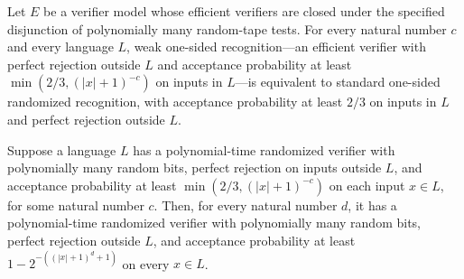 \begin{theorem}
\label{Randomized.inRPWeak_iff_inRP}
\leanok
{}
Let $E$ be a verifier model whose efficient verifiers are closed under the specified
disjunction of polynomially many random-tape tests. For every natural number $c$ and
every language $L$, weak one-sided recognition—an efficient verifier with perfect
rejection outside $L$ and acceptance probability at least $\min(2/3,(|x|+1)^{-c})$ on
inputs in $L$—is equivalent to standard one-sided randomized recognition, with
acceptance probability at least $2/3$ on inputs in $L$ and perfect rejection outside
$L$.
\end{theorem}

\begin{theorem}
\label{Randomized.rp_error_reduction_polyTime}
\leanok
{}
Suppose a language $L$ has a polynomial-time randomized verifier with polynomially many
random bits, perfect rejection on inputs outside $L$, and acceptance probability at
least $\min(2/3,(|x|+1)^{-c})$ on each input $x\in L$, for some natural number $c$.
Then, for every natural number $d$, it has a polynomial-time randomized verifier with
polynomially many random bits, perfect rejection outside $L$, and acceptance probability
at least $1-2^{-((|x|+1)^d+1)}$ on every $x\in L$.
\end{theorem}

